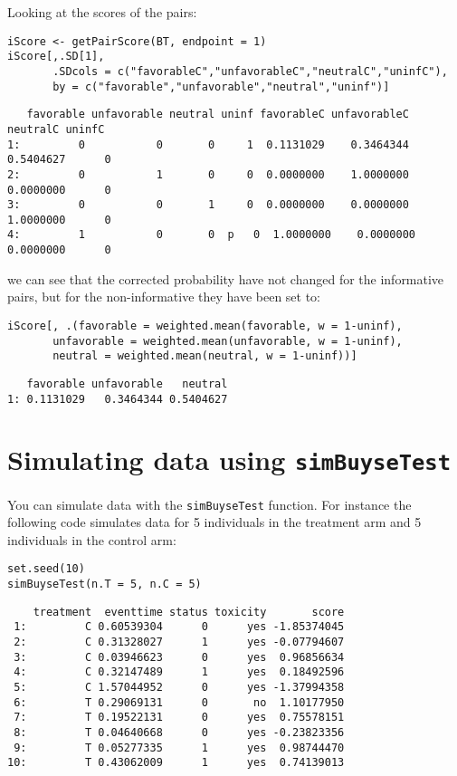 \documentclass[12pt]{article}
\begin{document}
Looking at the scores of the pairs:
\lstset{language=r,label= ,caption= ,captionpos=b,numbers=none}
\begin{lstlisting}
iScore <- getPairScore(BT, endpoint = 1)
iScore[,.SD[1], 
       .SDcols = c("favorableC","unfavorableC","neutralC","uninfC"),
       by = c("favorable","unfavorable","neutral","uninf")]
\end{lstlisting}

\begin{verbatim}
   favorable unfavorable neutral uninf favorableC unfavorableC  neutralC uninfC
1:         0           0       0     1  0.1131029    0.3464344 0.5404627      0
2:         0           1       0     0  0.0000000    1.0000000 0.0000000      0
3:         0           0       1     0  0.0000000    0.0000000 1.0000000      0
4:         1           0       0  p   0  1.0000000    0.0000000 0.0000000      0
\end{verbatim}

we can see that the corrected probability have not changed for the
informative pairs, but for the non-informative they have been set to:
\lstset{language=r,label= ,caption= ,captionpos=b,numbers=none}
\begin{lstlisting}
iScore[, .(favorable = weighted.mean(favorable, w = 1-uninf), 
	   unfavorable = weighted.mean(unfavorable, w = 1-uninf), 
	   neutral = weighted.mean(neutral, w = 1-uninf))]
\end{lstlisting}

\begin{verbatim}
   favorable unfavorable   neutral
1: 0.1131029   0.3464344 0.5404627
\end{verbatim}

\clearpage

\section{Simulating data using \texttt{simBuyseTest}}
\label{sec:orgea89ab3}
You can simulate data with the \texttt{simBuyseTest} function. For instance
the following code simulates data for 5 individuals in the treatment
arm and 5 individuals in the control arm:
\lstset{language=r,label= ,caption= ,captionpos=b,numbers=none}
\begin{lstlisting}
set.seed(10)
simBuyseTest(n.T = 5, n.C = 5)
\end{lstlisting}

\begin{verbatim}
    treatment  eventtime status toxicity       score
 1:         C 0.60539304      0      yes -1.85374045
 2:         C 0.31328027      1      yes -0.07794607
 3:         C 0.03946623      0      yes  0.96856634
 4:         C 0.32147489      1      yes  0.18492596
 5:         C 1.57044952      0      yes -1.37994358
 6:         T 0.29069131      0       no  1.10177950
 7:         T 0.19522131      0      yes  0.75578151
 8:         T 0.04640668      0      yes -0.23823356
 9:         T 0.05277335      1      yes  0.98744470
10:         T 0.43062009      1      yes  0.74139013
\end{verbatim}
\end{document}
